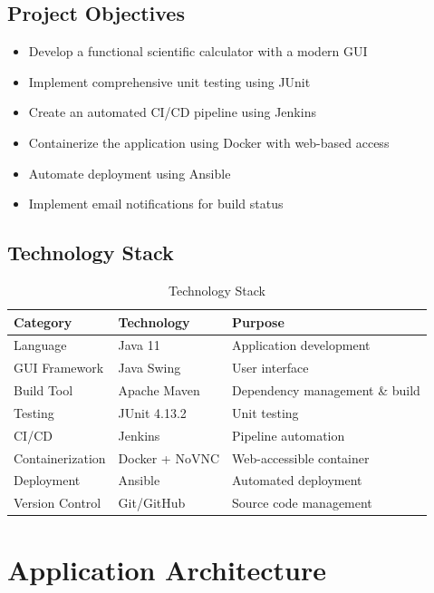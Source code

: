 \documentclass[12pt,a4paper]{article}
\begin{document}
\subsection{Project Objectives}

\begin{itemize}
    \item Develop a functional scientific calculator with a modern GUI
    \item Implement comprehensive unit testing using JUnit
    \item Create an automated CI/CD pipeline using Jenkins
    \item Containerize the application using Docker with web-based access
    \item Automate deployment using Ansible
    \item Implement email notifications for build status
\end{itemize}

\subsection{Technology Stack}

\begin{table}[H]
    \centering
    \begin{tabular}{|l|l|l|}
        \hline
        \textbf{Category} & \textbf{Technology} & \textbf{Purpose} \\
        \hline
        Language & Java 11 & Application development \\
        GUI Framework & Java Swing & User interface \\
        Build Tool & Apache Maven & Dependency management \& build \\
        Testing & JUnit 4.13.2 & Unit testing \\
        CI/CD & Jenkins & Pipeline automation \\
        Containerization & Docker + NoVNC & Web-accessible container \\
        Deployment & Ansible & Automated deployment \\
        Version Control & Git/GitHub & Source code management \\
        \hline
    \end{tabular}
    \caption{Technology Stack}
\end{table}

\section{Application Architecture}
\end{document}
